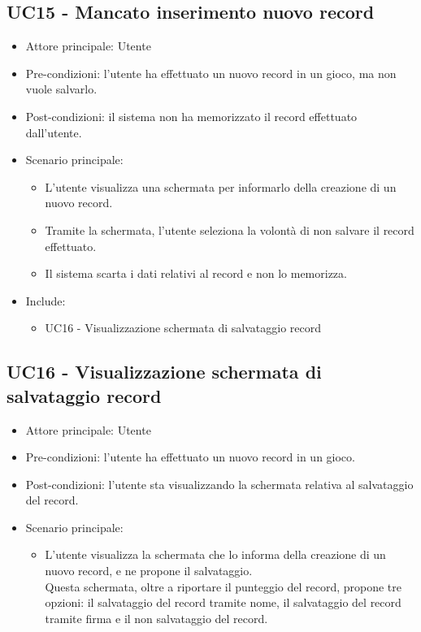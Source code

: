 \subsection{UC15 - Mancato inserimento nuovo record}
\begin{itemize}
    \item Attore principale: Utente
    \item Pre-condizioni: l'utente ha effettuato un nuovo record in un gioco, ma non vuole salvarlo.
    \item Post-condizioni: il sistema non ha memorizzato il record effettuato dall'utente.
    \item Scenario principale: \begin{itemize}
        \item L'utente visualizza una schermata per informarlo della creazione di un nuovo record.
        \item Tramite la schermata, l'utente seleziona la volontà di non salvare il record effettuato.
        \item Il sistema scarta i dati relativi al record e non lo memorizza.
    \end{itemize}
    \item Include: \begin{itemize}
        \item UC16 - Visualizzazione schermata di salvataggio record
    \end{itemize}
\end{itemize}

\subsection{UC16 - Visualizzazione schermata di salvataggio record}
\begin{itemize}
    \item Attore principale: Utente
    \item Pre-condizioni: l'utente ha effettuato un nuovo record in un gioco.
    \item Post-condizioni: l'utente sta visualizzando la schermata relativa al salvataggio del record.
    \item Scenario principale: \begin{itemize}
        \item L'utente visualizza la schermata che lo informa della creazione di un nuovo record, e ne propone il salvataggio.\\ Questa schermata, oltre a riportare il punteggio del record, propone tre opzioni: il salvataggio del record tramite nome, il salvataggio del record tramite firma e il non salvataggio del record.
    \end{itemize}
\end{itemize}

